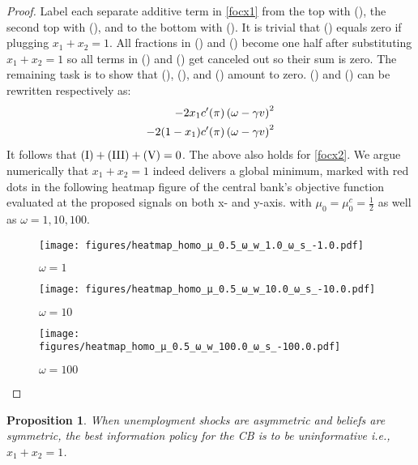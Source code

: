 \documentclass[12pt,a4paper]{article}
\newcommand{\RomanNumeralCaps}[1]{\MakeUppercase{\romannumeral #1}}
\newtheorem{proposition}{Proposition}
\begin{document}
\begin{proof}
    Label each separate additive term in \eqref{focx1} from the top with (\RomanNumeralCaps{1}), the second top with (\RomanNumeralCaps{2}), and to the bottom with (\RomanNumeralCaps{6}). It is trivial that (\RomanNumeralCaps{6}) equals zero if plugging $x_1+x_2=1$. All fractions in (\RomanNumeralCaps{2}) and (\RomanNumeralCaps{4}) become one half after substituting $x_1+x_2=1$ so all terms in (\RomanNumeralCaps{2}) and (\RomanNumeralCaps{4}) get canceled out so their sum is zero. The remaining task is to show that  (\RomanNumeralCaps{1}), (\RomanNumeralCaps{3}), and (\RomanNumeralCaps{5}) amount to zero. (\RomanNumeralCaps{3}) and (\RomanNumeralCaps{5}) can be rewritten respectively as:
    \begin{align}
        \small 
        -2x_1c^\prime(\pi)\left(\omega-\gamma v\right)^2 \\
        -2(1-x_1)c^\prime(\pi)\left(\omega-\gamma v\right)^2
    \end{align}
    It follows that $\mbox{(\RomanNumeralCaps{1})}+\mbox{(\RomanNumeralCaps{3})}+\mbox{(\RomanNumeralCaps{5})}=0$. The above also holds for \eqref{focx2}. We argue numerically that $x_1+x_2=1$ indeed delivers a global minimum, marked with red dots in the following heatmap figure of the central bank's objective function evaluated at the proposed signals on both x- and y-axis. with $\mu_0=\mu_0^c=\frac{1}{2}$ as well as $\omega=1,10,100$.
    \begin{figure}[htp!]
    \caption{$\omega=1$}
    \centering
    \texttt{[image: figures/heatmap\_homo\_μ\_0.5\_ω\_w\_1.0\_ω\_s\_-1.0.pdf]}
    \end{figure}
    \begin{figure}[htp!]
    \caption{$\omega=10$}
    \centering
    \texttt{[image: figures/heatmap\_homo\_μ\_0.5\_ω\_w\_10.0\_ω\_s\_-10.0.pdf]}
    \end{figure}
    \begin{figure}[htp!]
    \caption{$\omega=100$}
    \centering
    \texttt{[image: figures/heatmap\_homo\_μ\_0.5\_ω\_w\_100.0\_ω\_s\_-100.0.pdf]}
    \end{figure}
\end{proof}
\begin{proposition}
    When unemployment shocks are asymmetric and beliefs are symmetric, the best information policy for the CB is to be uninformative i.e., $x_1+x_2=1$.
\end{proposition}
\end{document}
